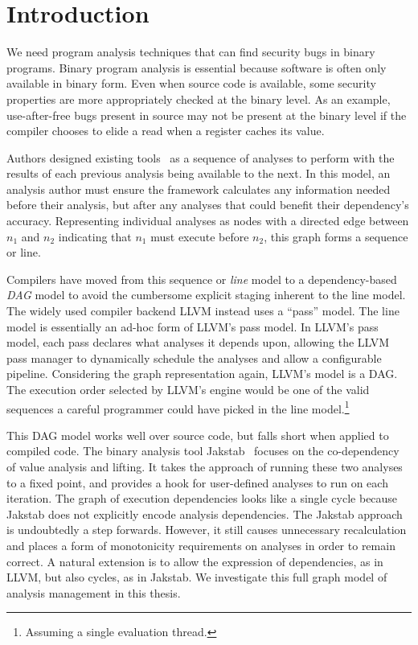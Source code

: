 \chapter{Introduction}
We need program analysis techniques that can find security bugs in binary programs.
Binary program analysis is essential because software is often only available in binary form.
Even when source code is available, some security properties are more appropriately checked at the binary level.
As an example, use-after-free bugs present in source may not be present at the binary level if the compiler chooses to elide a read when a register caches its value.

Authors designed existing tools~\cite{ida, bap, bitblaze, bindead} as a sequence of analyses to perform with the results of each previous analysis being available to the next.
In this model, an analysis author must ensure the framework calculates any information needed before their analysis, but after any analyses that could benefit their dependency's accuracy.
Representing individual analyses as nodes with a directed edge between $n_1$ and $n_2$ indicating that $n_1$ must execute before $n_2$, this graph forms a sequence or line.

Compilers have moved from this sequence or \emph{line} model to a dependency-based \emph{DAG} model to avoid the cumbersome explicit staging inherent to the line model.
The widely used compiler backend LLVM\cite{llvm} instead uses a ``pass'' model.
The line model is essentially an ad-hoc form of LLVM's pass model.
In LLVM's pass model, each pass declares what analyses it depends upon, allowing the LLVM pass manager to dynamically schedule the analyses and allow a configurable pipeline.
Considering the graph representation again, LLVM's model is a DAG.
The execution order selected by LLVM's engine would be one of the valid sequences a careful programmer could have picked in the line model.\footnote{Assuming a single evaluation thread.}

This DAG model works well over source code, but falls short when applied to compiled code.
The binary analysis tool Jakstab~\cite{jakstab} focuses on the co-dependency of value analysis and lifting. 
It takes the approach of running these two analyses to a fixed point, and provides a hook for user-defined analyses to run on each iteration.
The graph of execution dependencies looks like a single cycle because Jakstab does not explicitly encode analysis dependencies.
The Jakstab approach is undoubtedly a step forwards.
However, it still causes unnecessary recalculation and places a form of monotonicity requirements on analyses in order to remain correct.
A natural extension is to allow the expression of dependencies, as in LLVM, but also cycles, as in Jakstab.
We investigate this full graph model of analysis management in this thesis.

